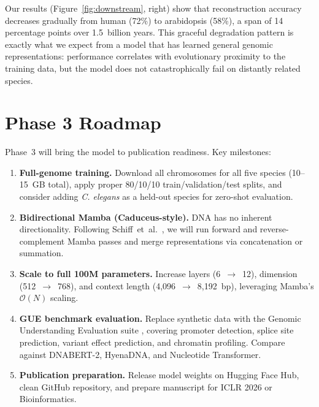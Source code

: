 \documentclass[11pt,a4paper,twoside]{article}
\begin{document}
Our results (Figure~\ref{fig:downstream}, right) show that reconstruction
accuracy decreases gradually from human (72\%) to arabidopsis (58\%), a span
of 14 percentage points over 1.5~billion years. This graceful degradation
pattern is exactly what we expect from a model that has learned general
genomic representations: performance correlates with evolutionary proximity
to the training data, but the model does not catastrophically fail on
distantly related species.

\section{Phase 3 Roadmap}
\label{sec:phase3}

Phase~3 will bring the model to publication readiness. Key milestones:

\begin{enumerate}
    \item \textbf{Full-genome training.} Download all chromosomes for all
          five species (10--15~GB total), apply proper 80/10/10
          train/validation/test splits, and consider adding \textit{C.
          elegans} as a held-out species for zero-shot evaluation.
    \item \textbf{Bidirectional Mamba (Caduceus-style).} DNA has no inherent
          directionality. Following Schiff~et~al.\ \cite{schiff2024caduceus},
          we will run forward and reverse-complement Mamba passes and merge
          representations via concatenation or summation.
    \item \textbf{Scale to full 100M parameters.} Increase layers (6~$\to$~12),
          dimension (512~$\to$~768), and context length (4,096~$\to$~8,192~bp),
          leveraging Mamba's $\mathcal{O}(N)$ scaling.
    \item \textbf{GUE benchmark evaluation.} Replace synthetic data with the
          Genomic Understanding Evaluation suite \cite{luo2024gue}, covering
          promoter detection, splice site prediction, variant effect
          prediction, and chromatin profiling. Compare against DNABERT-2,
          HyenaDNA, and Nucleotide Transformer.
    \item \textbf{Publication preparation.} Release model weights on Hugging
          Face Hub, clean GitHub repository, and prepare manuscript for ICLR
          2026 or Bioinformatics.
\end{enumerate}
\end{document}
